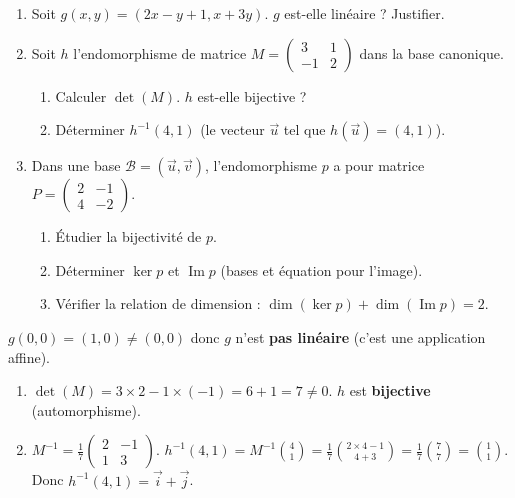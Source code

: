 \documentclass[11pt]{article}
\begin{document}
\begin{exercice}
\begin{enumerate}
  \item Soit $g(x,y) = (2x-y+1, x+3y)$. $g$ est-elle linéaire ? Justifier.
  \item Soit $h$ l'endomorphisme de matrice $M = \begin{pmatrix} 3 & 1 \\ -1 & 2 \end{pmatrix}$ dans la base canonique.
  \begin{enumerate}
    \item Calculer $\det(M)$. $h$ est-elle bijective ?
    \item Déterminer $h^{-1}(4, 1)$ (le vecteur $\vec{u}$ tel que $h(\vec{u})=(4,1)$).
  \end{enumerate}
  \item Dans une base $\mathcal{B}=(\vec{u},\vec{v})$, l'endomorphisme $p$ a pour matrice $P = \begin{pmatrix} 2 & -1 \\ 4 & -2 \end{pmatrix}$.
  \begin{enumerate}
    \item Étudier la bijectivité de $p$.
    \item Déterminer $\ker p$ et $\operatorname{Im}p$ (bases et équation pour l'image).
    \item Vérifier la relation de dimension : $\dim(\ker p) + \dim(\operatorname{Im}p) = 2$.
  \end{enumerate}
\end{enumerate}
\end{exercice}

\begin{corrige}[Exercice n°1]
$g(0,0) = (1,0) \neq (0,0)$ donc $g$ n'est \textbf{pas linéaire} (c'est une application affine).
\end{corrige}

\begin{corrige}[Exercice n°2]
\begin{enumerate}
  \item $\det(M) = 3\times 2 - 1\times(-1) = 6+1 = 7 \neq 0$. $h$ est \textbf{bijective} (automorphisme).
  \item $M^{-1} = \frac{1}{7}\begin{pmatrix} 2 & -1 \\ 1 & 3 \end{pmatrix}$.
  $h^{-1}(4,1) = M^{-1} \binom{4}{1} = \frac{1}{7}\binom{2\times4 - 1}{4 + 3} = \frac{1}{7}\binom{7}{7} = \binom{1}{1}$.
  Donc $h^{-1}(4,1) = \vec{i}+\vec{j}$.
\end{enumerate}
\end{corrige}
\end{document}
